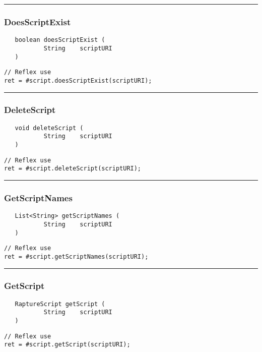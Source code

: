 \rule{15cm}{2pt}
\subsubsection{DoesScriptExist}
\label{Api:DoesScriptExist}
\begin{verbatim}
   boolean doesScriptExist (
           String    scriptURI
   )
\end{verbatim}
\begin{lstlisting}[language=reflex]
// Reflex use
ret = #script.doesScriptExist(scriptURI);
\end{lstlisting}



\rule{15cm}{2pt}
\subsubsection{DeleteScript}
\label{Api:DeleteScript}
\begin{verbatim}
   void deleteScript (
           String    scriptURI
   )
\end{verbatim}
\begin{lstlisting}[language=reflex]
// Reflex use
ret = #script.deleteScript(scriptURI);
\end{lstlisting}



\rule{15cm}{2pt}
\subsubsection{GetScriptNames}
\label{Api:GetScriptNames}
\begin{verbatim}
   List<String> getScriptNames (
           String    scriptURI
   )
\end{verbatim}
\begin{lstlisting}[language=reflex]
// Reflex use
ret = #script.getScriptNames(scriptURI);
\end{lstlisting}



\rule{15cm}{2pt}
\subsubsection{GetScript}
\label{Api:GetScript}
\begin{verbatim}
   RaptureScript getScript (
           String    scriptURI
   )
\end{verbatim}
\begin{lstlisting}[language=reflex]
// Reflex use
ret = #script.getScript(scriptURI);
\end{lstlisting}




